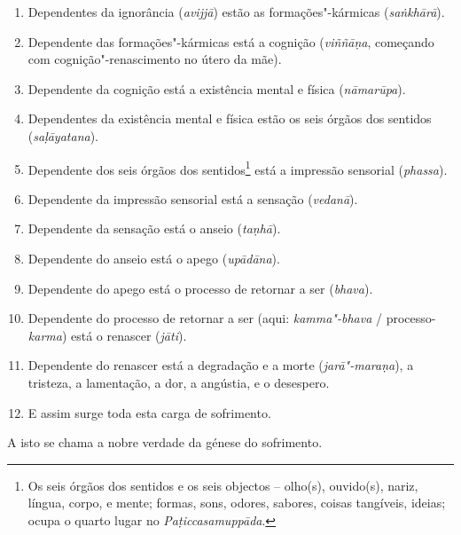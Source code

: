 \begin{enumerate}

  \item Dependentes da ignorância (\emph{avijjā}) estão as formações"-kármicas
        (\emph{saṅkhārā}).

  \item Dependente das formações"-kármicas está a cognição (\emph{viññāṇa},
        começando com cognição"-renascimento no útero da mãe).

  \item Dependente da cognição está a existência mental e física
        (\emph{nāmarūpa}).

  \item Dependentes da existência mental e física estão os seis órgãos dos
        sentidos (\emph{saḷāyatana}).

  \item Dependente dos seis órgãos dos sentidos\footnote{Os seis órgãos dos
        sentidos e os seis objectos -- olho(s), ouvido(s), nariz, língua, corpo,
        e mente; formas, sons, odores, sabores, coisas tangíveis, ideias; ocupa
        o quarto lugar no \emph{Paṭiccasamuppāda}.} está a impressão sensorial
        (\emph{phassa}).

  \item Dependente da impressão sensorial está a sensação (\emph{vedanā}).

  \item Dependente da sensação está o anseio (\emph{taṇhā}).

  \item Dependente do anseio está o apego (\emph{upādāna}).

  \item Dependente do apego está o processo de retornar a ser (\emph{bhava}).

  \item Dependente do processo de retornar a ser (aqui: \emph{kamma"-bhava} /
        processo-\emph{karma}) está o renascer (\emph{jāti}).

  \item Dependente do renascer está a degradação e a morte (\emph{jarā"-maraṇa}),
        a tristeza, a lamentação, a dor, a angústia, e o desespero.

  \item E assim surge toda esta carga de sofrimento.

\end{enumerate}

A isto se chama a nobre verdade da génese do sofrimento.

